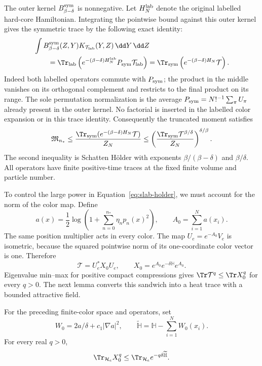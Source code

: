 The outer kernel $B_{\beta-\delta}^{\rm sym}$ is
nonnegative.  Let $H_N^{\rm lab}$ denote the original
labelled hard-core Hamiltonian.  Integrating the pointwise
bound against this outer kernel gives the symmetric trace
by the following exact identity:
\begin{align*}
 &\int B_{\beta-\delta}^{\rm sym}(Z,Y)
          K_{\mathcal T_{\rm lab}}(Y,Z)\,\dd Y\,\dd Z\\
 &\qquad=\Tr_{\rm lab}\left(
    e^{-(\beta-\delta)H_N^{\rm lab}}
                      P_{\rm sym}\mathcal T_{\rm lab}\right)
 =\Tr_{\rm sym}\left(e^{-(\beta-\delta)H_N}\mathcal T\right).
\end{align*}
Indeed both labelled operators commute with $P_{\rm sym}$;
the product in the middle vanishes on its orthogonal
complement and restricts to the final product on its range.
The sole permutation normalization is the average
$P_{\rm sym}=N!^{-1}\sum_\pi U_\pi$ already present
in the outer kernel.  No factorial is inserted in the
labelled color expansion or in this trace identity.
Consequently the truncated moment satisfies
\begin{equation}\label{eq:slab-holder}
 \mathfrak M_{n_*}
 \le\frac{\Tr_{\rm sym}
          (e^{-(\beta-\delta)H_N}\mathcal T)}{Z_N}
 \le\left(\frac{\Tr_{\rm sym}\mathcal T^{\beta/\delta}}
                   {Z_N}\right)^{\delta/\beta}.
\end{equation}
The second inequality is Schatten H\"older with exponents
$\beta/(\beta-\delta)$ and $\beta/\delta$.
All operators have finite positive-time traces at the
fixed finite volume and particle number.

To control the large power in Equation~\eqref{eq:slab-holder},
we must account for the norm of the color map.  Define
\begin{equation}\label{eq:color-normalization}
 a(x)=\frac12\log\left(1+\sum_{n=0}^{n_*}\eta_np_n(x)^2\right),
 \qquad A_0=\sum_{i=1}^N a(x_i).
\end{equation}
The same position multiplier acts in every color.
The map $U_e=e^{-A_0}V_e$ is isometric, because the
squared pointwise norm of its one-coordinate color vector
is one.  Therefore
\[
 \mathcal T=U_e^*X_0U_e,
 \qquad X_0=e^{A_0}e^{-\delta\mathbb H}e^{A_0}.
\]
Eigenvalue min--max for positive compact compressions gives
$\Tr\mathcal T^q\le\Tr X_0^q$ for every $q>0$.
The next lemma converts this sandwich into a heat trace
with a bounded attractive field.

\begin{lemma}\label{lem:sandwich}
For the preceding finite-color space and operators, set
\[
 W_0=2a/\delta+c_1|\nabla a|^2,\qquad
 \widetilde{\mathbb H}=\mathbb H-\sum_{i=1}^N W_0(x_i).
\]
For every real $q>0$,
\begin{equation}\label{eq:all-q-sandwich}
 \Tr_{\mathcal H_e}X_0^q
 \le\Tr_{\mathcal H_e}e^{-q\delta\widetilde{\mathbb H}}.
\end{equation}
\end{lemma}

